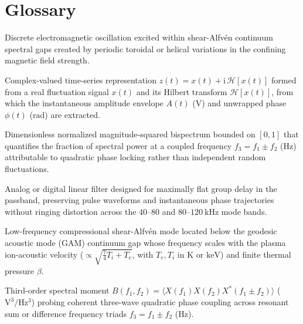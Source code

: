 \clearpage
{}
\section*{Glossary}

\begin{description}
\raggedright
\sloppy
\setlength{\itemsep}{0.2pt}
\setlength{\parsep}{0pt}
\setlength{\parskip}{0pt}
\item[Alfv\'{e}n Eigenmode (AE)] Discrete electromagnetic oscillation excited within shear-Alfv\'{e}n continuum spectral gaps created by periodic toroidal or helical variations in the confining magnetic field strength.

\item[Analytic Signal] Complex-valued time-series representation $z(t) = x(t) + \mathrm{i}\,\mathcal{H}[x(t)]$ formed from a real fluctuation signal $x(t)$ and its Hilbert transform $\mathcal{H}[x(t)]$, from which the instantaneous amplitude envelope $A(t)$ ($\mathrm{V}$) and unwrapped phase $\phi(t)$ ($\mathrm{rad}$) are extracted.

\item[Auto-bicoherence ($b^2$)] Dimensionless normalized magnitude-squared bispectrum bounded on $[0, 1]$ that quantifies the fraction of spectral power at a coupled frequency $f_3 = f_1 \pm f_2$ ($\mathrm{Hz}$) attributable to quadratic phase locking rather than independent random fluctuations.

\item[Bessel Filter] Analog or digital linear filter designed for maximally flat group delay in the passband, preserving pulse waveforms and instantaneous phase trajectories without ringing distortion across the $40\text{--}80$ and $80\text{--}120~\mathrm{kHz}$ mode bands.

\item[Beta-induced Alfv\'{e}n Eigenmode (BAE)] Low-frequency compressional shear-Alfv\'{e}n mode located below the geodesic acoustic mode (GAM) continuum gap whose frequency scales with the plasma ion-acoustic velocity ($\propto \sqrt{\tfrac{7}{4}T_i + T_e}$, with $T_e, T_i$ in $\mathrm{K}$ or $\mathrm{keV}$) and finite thermal pressure $\beta$.

\item[Bispectrum ($B$)] Third-order spectral moment $B(f_1, f_2) = \langle X(f_1) X(f_2) X^*(f_1 \pm f_2) \rangle$ ($\mathrm{V^3/Hz^3}$) probing coherent three-wave quadratic phase coupling across resonant sum or difference frequency triads $f_3 = f_1 \pm f_2$ ($\mathrm{Hz}$).


\end{description}
